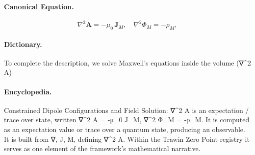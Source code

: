 \paragraph{Canonical Equation.}
\[
\nabla^2 \mathbf{A} = -\mu_0\,\mathbf{J}_M, \quad \nabla^2 \Phi_M = -\rho_M,
\]

\paragraph{Dictionary.}
To complete the description, we solve Maxwell's equations inside the volume (∇\textasciicircum{}2 A)

\paragraph{Encyclopedia.}
Constrained Dipole Configurations and Field Solution: ∇\textasciicircum{}2 A is an expectation / trace over state, written ∇\textasciicircum{}2 A = -μ\_0 J\_M, ∇\textasciicircum{}2 Φ\_M = -ρ\_M. It is computed as an expectation value or trace over a quantum state, producing an observable. It is built from ∇, J, M, defining ∇\textasciicircum{}2 A. Within the Trawin Zero Point registry it serves as one element of the framework's mathematical narrative.
